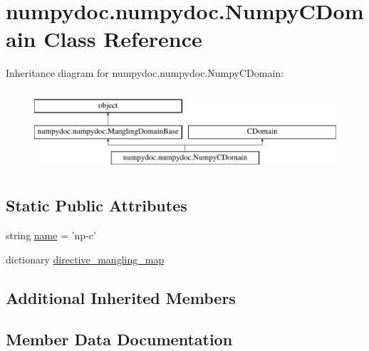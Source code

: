 \hypertarget{classnumpydoc_1_1numpydoc_1_1NumpyCDomain}{}\section{numpydoc.\+numpydoc.\+Numpy\+C\+Domain Class Reference}
\label{classnumpydoc_1_1numpydoc_1_1NumpyCDomain}
Inheritance diagram for numpydoc.\+numpydoc.\+Numpy\+C\+Domain\+:\begin{figure}[H]
\begin{center}
\leavevmode
\includegraphics[height=3.000000cm]{classnumpydoc_1_1numpydoc_1_1NumpyCDomain}
\end{center}
\end{figure}
\subsection*{Static Public Attributes}
\begin{DoxyCompactItemize}
\item 
string \hyperlink{classnumpydoc_1_1numpydoc_1_1NumpyCDomain_aa1d36db4db36abad015e85a68c3226bf}{name} = 'np-\/c'
\item 
dictionary \hyperlink{classnumpydoc_1_1numpydoc_1_1NumpyCDomain_a1679e0bcc8492e2fa3e9ada95182d825}{directive\+\_\+mangling\+\_\+map}
\end{DoxyCompactItemize}
\subsection*{Additional Inherited Members}


\subsection{Member Data Documentation}
\hypertarget{classnumpydoc_1_1numpydoc_1_1NumpyCDomain_a1679e0bcc8492e2fa3e9ada95182d825}{}
